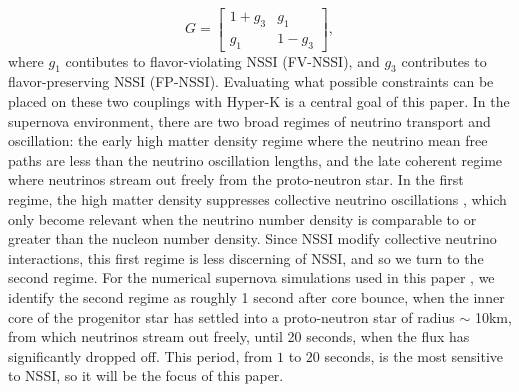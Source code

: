 \documentclass[a4paper,12pt]{article}
\begin{document}
\begin{equation}
    G = \begin{bmatrix}
        1 + g_{3} & g_{1} \\
        g_{1} & 1 - g_{3}
     \end{bmatrix},
\end{equation}
where $g_{1}$ contibutes to flavor-violating NSSI (FV-NSSI), and $g_{3}$ contributes to flavor-preserving NSSI (FP-NSSI). Evaluating what possible constraints can be placed on these two couplings with Hyper-K is a central goal of this paper.
\vskip 0.15in
In the supernova environment, there are two broad regimes of neutrino transport and oscillation: the early high matter density regime where the neutrino mean free paths are less than the neutrino oscillation lengths, and the late coherent regime where neutrinos stream out freely from the proto-neutron star. In the first regime, the high matter density suppresses collective neutrino oscillations \cite{Chakraborty:2011gd}, which only become relevant when the neutrino number density is comparable to or greater than the nucleon number density. Since NSSI modify collective neutrino interactions, this first regime is less discerning of NSSI, and so we turn to the second regime. For the numerical supernova simulations used in this paper \cite{Nakazato:2012qf}, we identify the second regime as roughly 1 second after core bounce, when the inner core of the progenitor star has settled into a proto-neutron star of radius $\sim$ 10km, from which neutrinos stream out freely, until 20 seconds, when the flux has significantly dropped off. This period, from $1$ to $20$ seconds, is the most sensitive to NSSI, so it will be the focus of this paper.
\end{document}
